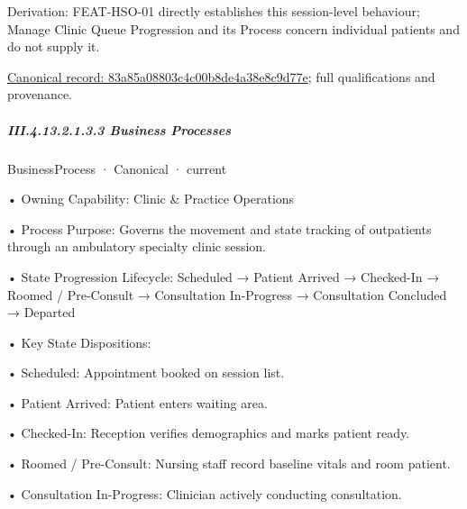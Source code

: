 Derivation: FEAT-HSO-01 directly establishes this session-level behaviour; Manage Clinic Queue Progression and its Process concern individual patients and do not supply it.


{\footnotesize \href{../../../../../../../continuum/business/business-function/83a85a08803c4c00b8de4a38e8c9d77e.md}{Canonical record: 83a85a08803c4c00b8de4a38e8c9d77e}; full qualifications and provenance.}\par
\subparagraph*{III.4.13.2.1.3.3 Business Processes}
\label{navigation:III.4.13.2.1.3.3}

\label{navigation:III.4.13.2.1.3.3.1}

\label{element:319d6956276a4cdeb43e350e1b01d078}
{\small BusinessProcess · Canonical · current}\par

•
Owning Capability: Clinic \& Practice Operations



•
Process Purpose: Governs the movement and state tracking of outpatients through an ambulatory specialty clinic session.



•
State Progression Lifecycle: Scheduled → Patient Arrived → Checked-In → Roomed / Pre-Consult → Consultation In-Progress → Consultation Concluded → Departed



•
Key State Dispositions:



•
Scheduled: Appointment booked on session list.



•
Patient Arrived: Patient enters waiting area.



•
Checked-In: Reception verifies demographics and marks patient ready.



•
Roomed / Pre-Consult: Nursing staff record baseline vitals and room patient.



•
Consultation In-Progress: Clinician actively conducting consultation.



